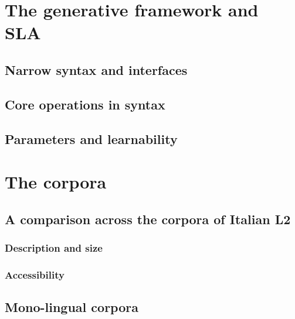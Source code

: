 \documentclass[
  a4paper,
  twoside,
  12pt,
  chapterprefix=false,
  bibliography=totocnumbered,
  listof=flat]{scrbook}
\begin{document}
\hypertarget{the-generative-framework-and-sla}{%
\chapter{The generative framework and SLA}\label{the-generative-framework-and-sla}}

\hypertarget{narrow-syntax-and-interfaces}{%
\section{Narrow syntax and interfaces}\label{narrow-syntax-and-interfaces}}

\hypertarget{core-operations-in-syntax}{%
\section{Core operations in syntax}\label{core-operations-in-syntax}}

\hypertarget{parameters-and-learnability}{%
\section{Parameters and learnability}\label{parameters-and-learnability}}

\hypertarget{the-corpora}{%
\chapter{The corpora}\label{the-corpora}}

\hypertarget{a-comparison-across-the-corpora-of-italian-l2}{%
\section{A comparison across the corpora of Italian L2}\label{a-comparison-across-the-corpora-of-italian-l2}}

\hypertarget{description-and-size}{%
\subsection{Description and size}\label{description-and-size}}

\hypertarget{accessibility}{%
\subsection{Accessibility}\label{accessibility}}

\hypertarget{mono-lingual-corpora}{%
\section{Mono-lingual corpora}\label{mono-lingual-corpora}}
\end{document}
